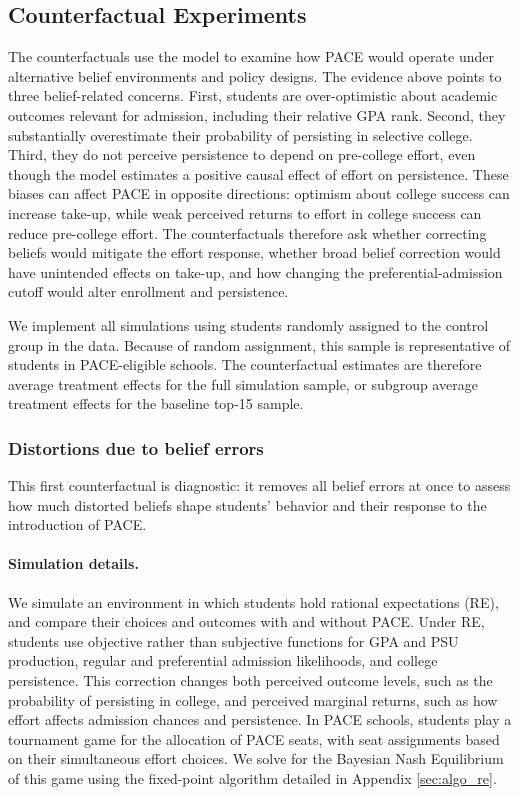 \subsection{Counterfactual Experiments}\label{sec:counterfactuals}
The counterfactuals use the model to examine how PACE would operate under alternative belief environments and policy designs. The evidence above points to three belief-related concerns. First, students are over-optimistic about academic outcomes relevant for admission, including their relative GPA rank. Second, they substantially overestimate their probability of persisting in selective college. Third, they do not perceive persistence to depend on pre-college effort, even though the model estimates a positive causal effect of effort on persistence. These biases can affect PACE in opposite directions: optimism about college success can increase take-up, while weak perceived returns to effort in college success can reduce pre-college effort. The counterfactuals therefore ask whether correcting beliefs would mitigate the effort response, whether broad belief correction would have unintended effects on take-up, and how changing the preferential-admission cutoff would alter enrollment and persistence.\par 


We implement all simulations using students randomly assigned to the control group in the data. Because of random assignment, this sample is representative of students in PACE-eligible schools. The counterfactual estimates are therefore average treatment effects for the full simulation sample, or subgroup average treatment effects for the baseline top-15 sample.\par


\subsubsection{Distortions due to belief errors} 
This first counterfactual is diagnostic: it removes all belief errors at once to assess how much distorted beliefs shape students' behavior and their response to the introduction of PACE.
\paragraph{Simulation details.} We simulate an environment in which students hold rational expectations (RE), and compare their choices and outcomes with and without PACE. Under RE, students use objective rather than subjective functions for GPA and PSU production, regular and preferential admission likelihoods, and college persistence. This correction changes both perceived outcome levels, such as the probability of persisting in college, and perceived marginal returns, such as how effort affects admission chances and persistence. In PACE schools, students play a tournament game for the allocation of PACE seats, with seat assignments based on their simultaneous effort choices. We solve for the Bayesian Nash Equilibrium of this game using the fixed-point algorithm detailed in Appendix \ref{sec:algo_re}.\par





